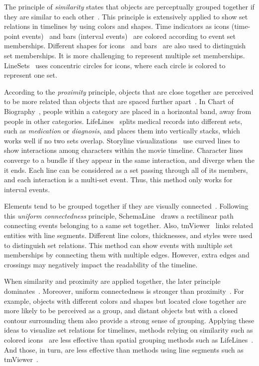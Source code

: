 The principle of \textit{similarity} states that objects are perceptually grouped together if they are similar to each other~\cite{Koffka1935}. This principle is extensively applied to show set relations in timelines by using colors and shapes. Time indicators as icons (time-point events)~\cite{SimileTimeline2009} and bars (interval events)~\cite{Wang2008} are colored according to event set memberships. Different shapes for icons~\cite{TimeGlider2012} and bars~\cite{Plaisant1998} are also used to distinguish set memberships. It is more challenging to represent multiple set memberships. LineSets~\cite{Alper2011} uses concentric circles for icons, where each circle is colored to represent one set.

According to the \textit{proximity} principle, objects that are close together are perceived to be more related than objects that are spaced further apart~\cite{Koffka1935}. In Chart of Biography~\cite{Priestley1765}, people within a category are placed in a horizontal band, away from people in other categories. LifeLines~\cite{Plaisant1998} splits medical records into different sets, such as \textit{medication} or \textit{diagnosis}, and places them into vertically stacks, which works well if no two sets overlap. Storyline visualizations~\cite{Tanahashi2012,Liu2013} use curved lines to show interactions among characters within the movie timeline. Character lines converge to a bundle if they appear in the same interaction, and diverge when the it ends. Each line can be considered as a set passing through all of its members, and each interaction is a multi-set event. Thus, this method only works for interval events.

Elements tend to be grouped together if they are visually connected~\cite{Palmer1994}. Following this \textit{uniform connectedness} principle, SchemaLine~\cite{Nguyen2014} draws a rectilinear path connecting events belonging to a same set together. Also, tmViewer~\cite{Kumar1998} links related entities with line segments. Different line colors, thicknesses, and styles were used to distinguish set relations. This method can show events with multiple set memberships by connecting them with multiple edges. However, extra edges and crossings may negatively impact the readability of the timeline.

When similarity and proximity are applied together, the later principle dominates~\cite{Ware2013}. Moreover, uniform connectedness is stronger than proximity~\cite{Palmer1994}. For example, objects with different colors and shapes but located close together are more likely to be perceived as a group, and distant objects but with a closed contour surrounding them also provide a strong sense of grouping. Applying these ideas to visualize set relations for timelines, methods relying on similarity such as colored icons~\cite{Wang2008} are less effective than spatial grouping methods such as LifeLines~\cite{Plaisant1996a}. And those, in turn, are less effective than methods using line segments such as tmViewer~\cite{Kumar1998}. 

